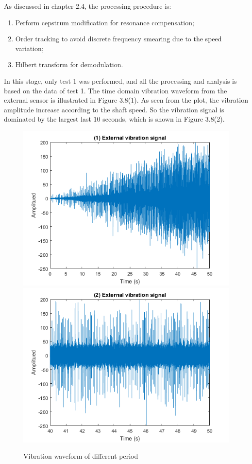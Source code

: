 As discussed in chapter 2.4, the processing procedure is:

\begin{enumerate}
	\item Perform cepstrum modification for resonance compensation;
	
	\item Order tracking to avoid discrete frequency smearing due to the speed variation;
	
	\item Hilbert transform for demodulation.
	
\end{enumerate}

In this stage, only test 1 was performed, and all the processing and analysis is based on the data of test 1. The time domain vibration waveform from the external sensor is illustrated in Figure 3.8(1). As seen from the plot, the vibration amplitude increase according to the shaft speed. So the vibration signal is dominated by the largest last 10 seconds, which is shown in Figure 3.8(2).

\begin{figure}[htbp]
	\centering
	\includegraphics[scale =0.48]{wave}
	\includegraphics[scale =0.48]{last10}
	\caption{Vibration waveform of different period}
	\label{wave1}
\end{figure}

